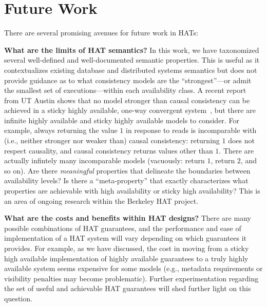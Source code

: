 
\section{Future Work}
\label{sec:futurework}

There are several promising avenues for future work in HATs:

\textbf{What are the limits of HAT semantics?}  In this work, we have
taxonomized several well-defined and well-documented semantic
properties. This is useful as it contextualizes existing database and
distributed systems semantics but does not provide guidance as to what
consistency models are the ``strongest''---or admit the smallest set
of executions---within each availability class. A recent report from
UT Austin shows that no model stronger than causal consistency can be
achieved in a sticky highly available, one-way convergent
system~\cite{cac}, but there are infinite highly available and sticky
highly available models to consider. For example, always returning the
value $1$ in response to reads is incomparable with (i.e., neither
stronger nor weaker than) causal consistency: returning $1$ does not
respect causality, and causal consistency returns values other than
$1$. There are actually infintely many incomparable models (vacuously:
return $1$, return $2$, and so on). Are there \textit{meaningful}
properties that delineate the boundaries between availability levels?
Is there a ``meta-property'' that exactly characterizes what
properties are achievable with high availability or sticky high
availability? This is an area of ongoing research within the Berkeley
HAT project. 

\textbf{What are the costs and benefits within HAT designs?} There are
many possible combinations of HAT guarantees, and the performance and
ease of implementation of a HAT system will vary depending on which
guarantees it provides. For example, as we have discussed, the cost in
moving from a sticky high available implementation of highly available
guarantees to a truly highly available system seems expensive for some
models (e.g., metadata requirements or visibility penalties may
become problematic). Further experimentation regarding the set of
useful and achievable HAT guarantees will shed further light on this
question.

